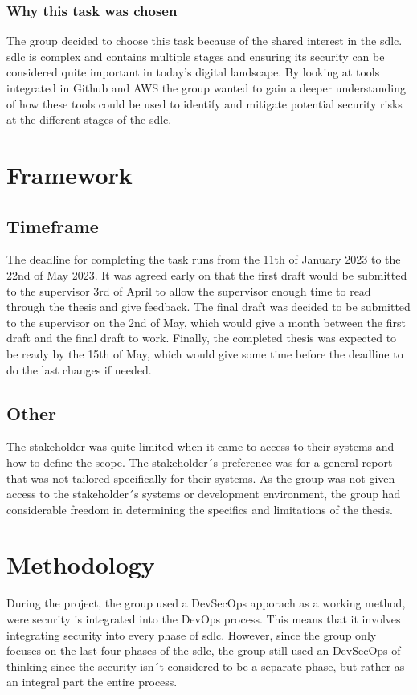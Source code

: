 \subsubsection{Why this task was chosen}
The group decided to choose this task because of the shared interest in the \acrlong{sdlc}. \acrshort{sdlc} is complex and contains multiple stages and ensuring its security can be considered quite important in today's digital landscape. By looking at tools integrated in Github and AWS the group wanted to gain a deeper understanding of how these tools could be used to identify and mitigate potential security risks at the different stages of the \acrshort{sdlc}.

\newpage
\section{Framework}

\subsection{Timeframe}
The deadline for completing the task runs from the 11th of January 2023 to the 22nd of May 2023. It was agreed early on that the first draft would be submitted to the supervisor 3rd of April to allow the supervisor enough time to read through the thesis and give feedback. The final draft was decided to be submitted to the supervisor on the 2nd of May, which would give a month between the first draft and the final draft to work. Finally, the completed thesis was expected to be ready by the 15th of May, which would give some time before the deadline to do the last changes if needed. 



\subsection{Other}
The stakeholder was quite limited when it came to access to their systems and how to define the scope. The stakeholder´s preference was for a general report that was not tailored specifically for their systems. As the group was not given access to the stakeholder´s systems or development environment, the group had considerable freedom in determining the specifics and limitations of the thesis. 

\section{Methodology}
During the project, the group used a DevSecOps apporach as a working method, were security is integrated into the DevOps process. This means that it involves integrating security into every phase of \acrlong{sdlc}. However, since the group only focuses on the last four phases of the \acrshort{sdlc}, the group still used an DevSecOps of thinking since the security isn´t considered to be a separate phase, but rather as an integral part the entire process. 

